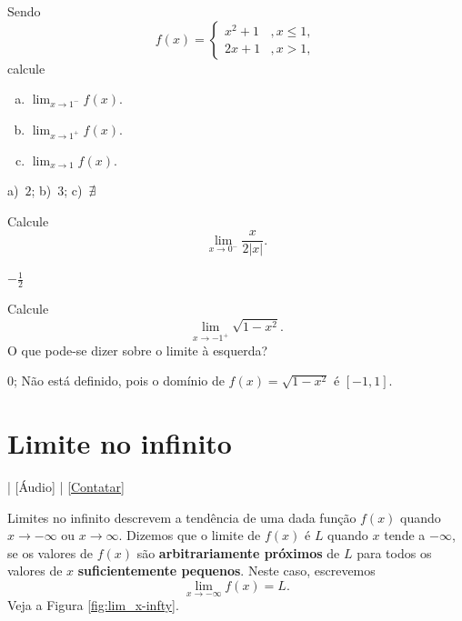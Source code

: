 \begin{exer}
  Sendo
  \begin{equation}
    f(x) = \left\{
      \begin{array}{ll}
        x^2+1 &, x\leq 1,\\
        2x+1 &, x>1,
      \end{array}
    \right.
  \end{equation}
  calcule
  \begin{enumerate}[a)]
  \item $\displaystyle \lim_{x\to 1^-} f(x)$.
  \item $\displaystyle \lim_{x\to 1^+} f(x)$.
  \item $\displaystyle \lim_{x\to 1} f(x)$.
  \end{enumerate}
\end{exer}
\begin{resp}
  a)~$2$; b)~$3$; c)~$\nexists$
\end{resp}

\begin{exer}
  Calcule
  \begin{equation}
    \lim_{x\to 0^-} \frac{x}{2|x|}.
  \end{equation}
\end{exer}
\begin{resp}
  $-\frac{1}{2}$
\end{resp}

\begin{exer}
  Calcule
  \begin{equation}
    \lim_{x\to -1^+} \sqrt{1-x^2}.
  \end{equation}
  O que pode-se dizer sobre o limite à esquerda?
\end{exer}
\begin{resp}
  $0$; Não está definido, pois o domínio de $f(x)=\sqrt{1-x^2}$ é $[-1, 1]$.
\end{resp}

\section{Limite no infinito}\label{cap_lim_sec_liminf}

\begin{flushright}
  [Vídeo] | [Áudio] | \href{https://phkonzen.github.io/notas/contato.html}{[Contatar]}
\end{flushright}

Limites no infinito descrevem a tendência de uma dada função $f(x)$ quando $x\to -\infty$ ou $x\to\infty$. Dizemos que o limite de $f(x)$ é $L$ quando $x$ tende a $-\infty$, se os valores de $f(x)$ são {\bf arbitrariamente próximos} de $L$ para todos os valores de $x$ {\bf suficientemente pequenos}. Neste caso, escrevemos
\begin{equation}
  \lim_{x\to -\infty} f(x) = L.
\end{equation}
Veja a Figura \ref{fig:lim_x-infty}.

